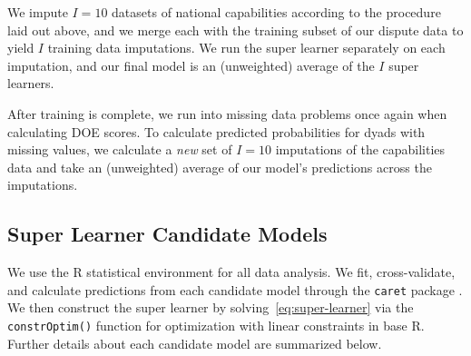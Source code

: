 We impute $I = 10$ datasets of national capabilities according to the procedure laid out above, and we merge each with the training subset of our dispute data to yield $I$ training data imputations.
We run the super learner separately on each imputation, and our final model is an (unweighted) average of the $I$ super learners.

After training is complete, we run into missing data problems once again when calculating DOE scores.
To calculate predicted probabilities for dyads with missing values, we calculate a \emph{new} set of $I = 10$ imputations of the capabilities data and take an (unweighted) average of our model's predictions across the imputations.

\subsection{Super Learner Candidate Models}

We use the R statistical environment \citep{pkg-R} for all data analysis.
We fit, cross-validate, and calculate predictions from each candidate model through the \texttt{caret} package \citep{pkg-caret}.
We then construct the super learner by solving~\eqref{eq:super-learner} via the \texttt{constrOptim()} function for optimization with linear constraints in base R.
Further details about each candidate model are summarized below.

